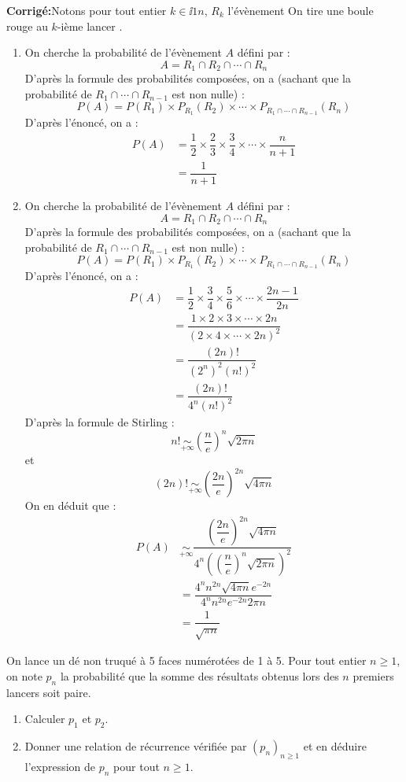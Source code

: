\documentclass[a4paper,twoside,french,10pt]{VcCours}
\newcommand{\corr}{\textbf{Corrigé:}}
\begin{document}
\corr Notons pour tout entier $k \in \ii{1}{n}$, $R_k$ l'évènement \og On tire une boule rouge au $k$-ième lancer \fg.

\begin{enumerate}
\item On cherche la probabilité de l'évènement $A$ défini par :
$$ A = R_1 \cap R_2 \cap \cdots \cap R_n$$
D'après la formule des probabilités composées, on a (sachant que la probabilité de $R_1 \cap \cdots \cap R_{n-1}$ est non nulle) :
$$ P(A) = P(R_1) \times P_{R_1}(R_2) \times \cdots \times P_{R_1 \cap \cdots \cap R_{n-1}}(R_n)$$
D'après l'énoncé, on a :
\begin{align*}
P(A) & = \dfrac{1}{2} \times \dfrac{2}{3} \times \dfrac{3}{4} \times \cdots \times \dfrac{n}{n+1} \\
& = \dfrac{1}{n+1}
\end{align*}
\item On cherche la probabilité de l'évènement $A$ défini par :
$$ A = R_1 \cap R_2 \cap \cdots \cap R_n$$
D'après la formule des probabilités composées, on a (sachant que la probabilité de $R_1 \cap \cdots \cap R_{n-1}$ est non nulle) :
$$ P(A) = P(R_1) \times P_{R_1}(R_2) \times \cdots \times P_{R_1 \cap \cdots \cap R_{n-1}}(R_n)$$
D'après l'énoncé, on a :
\begin{align*}
P(A) & = \dfrac{1}{2} \times \dfrac{3}{4} \times \dfrac{5}{6} \times \cdots \times \dfrac{2n-1}{2n} \\
& = \dfrac{1 \times 2 \times 3 \times \cdots \times 2n}{(2 \times 4 \times \cdots \times 2n)^2} \\
& = \dfrac{(2n)!}{(2^n)^2 (n!)^2} \\
&= \dfrac{(2n)!}{4^n (n!)^2}
\end{align*}
D'après la formule de Stirling :
$$ n! \underset{+ \infty}{\sim} \left(\dfrac{n}{e} \right)^n \sqrt{2 \pi n}$$
et 
$$ (2n)! \underset{+ \infty}{\sim} \left(\dfrac{2n}{e} \right)^{2n} \sqrt{4 \pi n}$$
On en déduit que :
\begin{align*}
P(A) & \underset{+ \infty}{\sim} \dfrac{\left(\dfrac{2n}{e} \right)^{2n} \sqrt{4 \pi n}}{4^n \left(\left(\dfrac{n}{e} \right)^n \sqrt{2 \pi n}\right)^2} \\
& = \dfrac{4^n n^{2n} \sqrt{4 \pi n} e^{-2n}}{4^n n^{2n} e^{-2n}2\pi n} \\
& = \dfrac{1}{\sqrt{\pi n}}
\end{align*}
\end{enumerate}

\begin{Exercice}{} On lance un dé non truqué à 5 faces numérotées de 1 à 5. Pour tout entier $n \geq 1$, on note $p_n$ la probabilité que la somme des résultats obtenus lors des $n$ premiers lancers soit paire. 
\begin{enumerate}
\item Calculer $p_1$ et $p_2$.
\item Donner une relation de récurrence vérifiée par $(p_n)_{n \geq 1}$ et en déduire l'expression de $p_n$ pour tout $n \geq 1$.
\end{enumerate}
\end{Exercice}
\end{document}
